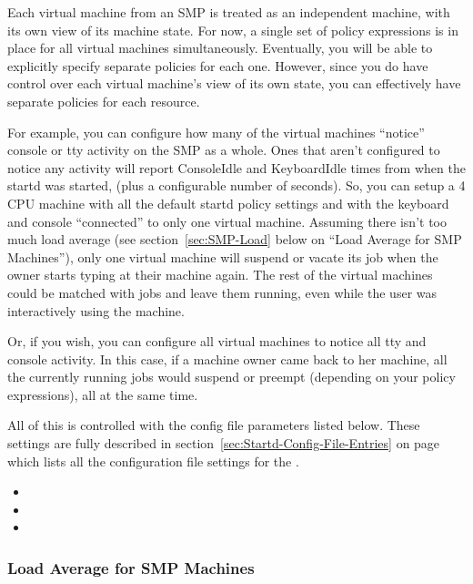 Each virtual machine from an SMP is treated as an independent machine,
with its own view of its machine state.
For now, a single set of policy expressions is in place for all
virtual machines simultaneously.  
Eventually, you will be able to explicitly specify separate policies
for each one.
However, since you do have control over each virtual machine's view of
its own state, you can effectively have separate policies for each
resource.

For example, you can configure how many of the virtual machines
``notice'' console or tty activity on the SMP as a whole.
Ones that aren't configured to notice any activity will report
ConsoleIdle and KeyboardIdle times from when the startd was started,
(plus a configurable number of seconds).
So, you can setup a 4 CPU machine with all the default startd policy
settings and with the keyboard and console ``connected'' to only one
virtual machine.
Assuming there isn't too much load average (see
section~\ref{sec:SMP-Load} below on ``Load Average for SMP
Machines''), only one virtual machine will suspend or vacate its job
when the owner starts typing at their machine again.
The rest of the virtual machines could be matched with jobs and leave
them running, even while the user was interactively using the
machine. 

Or, if you wish, you can configure all virtual machines to notice all
tty and console activity.
In this case, if a machine owner came back to her machine, all the
currently running jobs would suspend or preempt (depending on your
policy expressions), all at the same time.

All of this is controlled with the config file parameters listed
below.    
These settings are fully described in
section~\ref{sec:Startd-Config-File-Entries} on
page~\pageref{sec:Startd-Config-File-Entries} which lists all the
configuration file settings for the .

\begin{itemize}
\item {}
\item {}
\item {}
\end{itemize}


\subsubsection{\label{sec:SMP-Load}
Load Average for SMP Machines}

